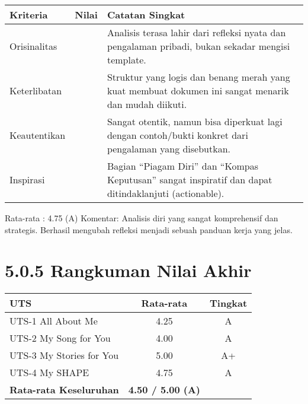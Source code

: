 \documentclass[
  letterpaper,
  DIV=11,
  numbers=noendperiod]{scrreprt}
\begin{document}
\begin{longtable}[]{@{}
  >{\raggedright\arraybackslash}p{}
  >{\centering\arraybackslash}p{}
  >{\raggedright\arraybackslash}p{}@{}}
\toprule\noalign{}
\begin{minipage}[b]{\linewidth}\raggedright
Kriteria
\end{minipage} & \begin{minipage}[b]{\linewidth}\centering
Nilai
\end{minipage} & \begin{minipage}[b]{\linewidth}\raggedright
Catatan Singkat
\end{minipage} \\
\midrule\noalign{}
\endhead
\bottomrule\noalign{}
\endlastfoot
Orisinalitas & 5 & Analisis terasa lahir dari refleksi nyata dan
pengalaman pribadi, bukan sekadar mengisi template. \\
Keterlibatan & 5 & Struktur yang logis dan benang merah yang kuat
membuat dokumen ini sangat menarik dan mudah diikuti. \\
Keautentikan & 4 & Sangat otentik, namun bisa diperkuat lagi dengan
contoh/bukti konkret dari pengalaman yang disebutkan. \\
Inspirasi & 5 & Bagian ``Piagam Diri'' dan ``Kompas Keputusan'' sangat
inspiratif dan dapat ditindaklanjuti (actionable). \\
\end{longtable}

Rata-rata : 4.75 (A) Komentar: Analisis diri yang sangat komprehensif
dan strategis. Berhasil mengubah refleksi menjadi sebuah panduan kerja
yang jelas.

\section{5.0.5 Rangkuman Nilai Akhir}\label{rangkuman-nilai-akhir-1}

\begin{longtable}[]{@{}lcc@{}}
\toprule\noalign{}
UTS & Rata-rata & Tingkat \\
\midrule\noalign{}
\endhead
\bottomrule\noalign{}
\endlastfoot
UTS-1 All About Me & 4.25 & A \\
UTS-2 My Song for You & 4.00 & A \\
UTS-3 My Stories for You & 5.00 & A+ \\
UTS-4 My SHAPE & 4.75 & A \\
\textbf{Rata-rata Keseluruhan} & \textbf{4.50 / 5.00 (A)} & \\
\end{longtable}
\end{document}
